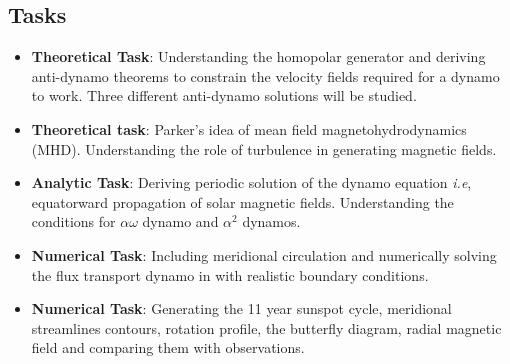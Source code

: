 \documentclass[11pt]{article}
\begin{document}
\subsection{Tasks}
\begin{itemize}
\item {\bf Theoretical Task}: Understanding the homopolar generator and deriving anti-dynamo theorems to constrain the velocity fields required for a dynamo to work. Three different anti-dynamo solutions will be studied.
\item {\bf Theoretical task}: Parker's idea of mean field magnetohydrodynamics (MHD). Understanding the role of turbulence in generating magnetic fields.
\item {\bf Analytic Task}: Deriving periodic solution of the dynamo equation {\it i.e}, equatorward propagation of solar magnetic fields. Understanding the conditions for $\alpha \omega$ dynamo and $\alpha^{2}$ dynamos.
\item {\bf Numerical Task}: Including meridional circulation and numerically solving the flux transport dynamo in with realistic boundary conditions. 
\item {\bf Numerical Task}: Generating the 11 year sunspot cycle, meridional streamlines contours, rotation profile, the butterfly diagram, radial magnetic field and comparing them with observations.
\end{itemize}
\end{document}
